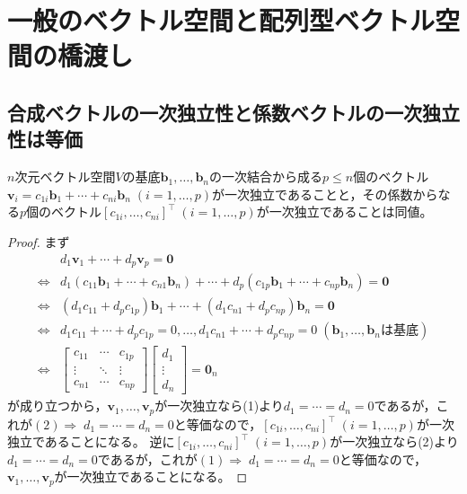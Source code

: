     \section{一般のベクトル空間と配列型ベクトル空間の橋渡し}
        \subsection{合成ベクトルの一次独立性と係数ベクトルの一次独立性は等価}
            \begin{shadebox}
                $n$次元ベクトル空間$V$の基底$\bm{b}_1,\dotsc,\bm{b}_n$の一次結合から成る$p\leq n$個のベクトル$\bm{v}_i=c_{1i}\bm{b}_1+\dotsb+c_{ni}\bm{b}_n\;(i=1,\dotsc,p)$が一次独立であることと，その係数からなる$p$個のベクトル$[c_{1i},\dotsc,c_{ni}]^\top\;(i=1,\dotsc,p)$が一次独立であることは同値。
            \end{shadebox}
            \begin{proof}
                \quad\par
                まず
                \begin{align*}
                    \quad& d_1\bm{v}_1 + \dotsb + d_p\bm{v}_p = \bm{0} \tag{1} \\
                    \iff& d_1(c_{11}\bm{b}_1 + \dotsb + c_{n1}\bm{b}_n) + \dotsb + d_p(c_{1p}\bm{b}_1 + \dotsb + c_{np}\bm{b}_n) = \bm{0} \\
                    \iff& (d_1 c_{11} + d_p c_{1p})\bm{b}_1 + \dotsb + (d_1 c_{n1} + d_p c_{np})\bm{b}_n = \bm{0} \\
                    \iff& d_1 c_{11} + \dotsb + d_p c_{1p} = 0,\dotsc,d_1 c_{n1} + \dotsb + d_p c_{np} = 0\;(\bm{b}_1,\dotsc,\bm{b}_n\mathrm{は基底}) \\
                    \iff&
                    \begin{bmatrix}
                        c_{11} & \cdots & c_{1p} \\
                        \vdots & \ddots & \vdots \\
                        c_{n1} & \cdots & c_{np}
                    \end{bmatrix}
                    \begin{bmatrix}
                        d_1 \\
                        \vdots \\
                        d_n
                    \end{bmatrix}
                    =\bm{0}_n \tag{2}
                \end{align*}
                が成り立つから，$\bm{v}_1,\dotsc,\bm{v}_p$が一次独立なら(1)より$d_1=\dotsb=d_n=0$であるが，これが$(2)\Rightarrow\;d_1=\dotsb=d_n=0$と等価なので，$[c_{1i},\dotsc,c_{ni}]^\top\;(i=1,\dotsc,p)$が一次独立であることになる。
                逆に$[c_{1i},\dotsc,c_{ni}]^\top\;(i=1,\dotsc,p)$が一次独立なら(2)より$d_1=\dotsb=d_n=0$であるが，これが$(1)\Rightarrow\;d_1=\dotsb=d_n=0$と等価なので，$\bm{v}_1,\dotsc,\bm{v}_p$が一次独立であることになる。
            \end{proof}
